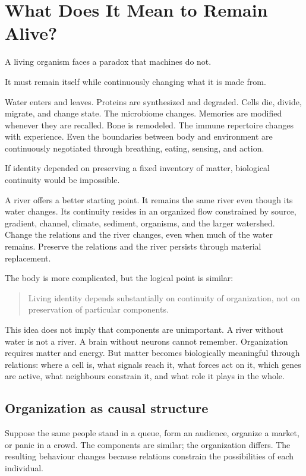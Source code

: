 \chapter{What Does It Mean to Remain Alive?}

A living organism faces a paradox that machines do not.

It must remain itself while continuously changing what it is made from.

Water enters and leaves. Proteins are synthesized and degraded. Cells die, divide, migrate, and change state. The microbiome changes. Memories are modified whenever they are recalled. Bone is remodeled. The immune repertoire changes with experience. Even the boundaries between body and environment are continuously negotiated through breathing, eating, sensing, and action.

If identity depended on preserving a fixed inventory of matter, biological continuity would be impossible.

A river offers a better starting point. It remains the same river even though its water changes. Its continuity resides in an organized flow constrained by source, gradient, channel, climate, sediment, organisms, and the larger watershed. Change the relations and the river changes, even when much of the water remains. Preserve the relations and the river persists through material replacement.

The body is more complicated, but the logical point is similar:

\begin{quote}
Living identity depends substantially on continuity of organization, not on preservation of particular components.
\end{quote}

This idea does not imply that components are unimportant. A river without water is not a river. A brain without neurons cannot remember. Organization requires matter and energy. But matter becomes biologically meaningful through relations: where a cell is, what signals reach it, what forces act on it, which genes are active, what neighbours constrain it, and what role it plays in the whole.

\section{Organization as causal structure}

Suppose the same people stand in a queue, form an audience, organize a market, or panic in a crowd. The components are similar; the organization differs. The resulting behaviour changes because relations constrain the possibilities of each individual.

